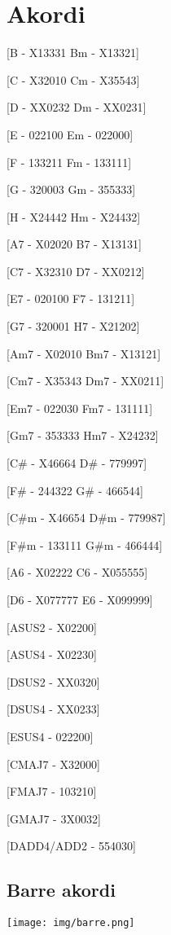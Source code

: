 \section{Akordi}
\begin{guitar}
[A - X02220  Am - X02210]

[B - X13331  Bm - X13321]

[C - X32010  Cm - X35543]  

[D - XX0232  Dm - XX0231] 

[E - 022100  Em - 022000] 

[F - 133211  Fm - 133111]

[G - 320003  Gm - 355333]

[H - X24442  Hm - X24432]


[A7 - X02020  B7 - X13131]

[C7 - X32310  D7 - XX0212]

[E7 - 020100  F7 - 131211]

[G7 - 320001  H7 - X21202]


[Am7 - X02010  Bm7 - X13121]

[Cm7 - X35343  Dm7 - XX0211]

[Em7 - 022030  Fm7 - 131111]

[Gm7 - 353333  Hm7 - X24232]


[C# - X46664  D# - 779997]

[F# - 244322  G# - 466544]


[C#m - X46654  D#m - 779987]

[F#m - 133111  G#m - 466444]


[A6 - X02222  C6 - X055555]

[D6 - X077777 E6 - X099999]


[ASUS2 - X02200]

[ASUS4 - X02230]

[DSUS2 - XX0320] 

[DSUS4 - XX0233]

[ESUS4 - 022200]

[CMAJ7 - X32000]

[FMAJ7 - 103210]

[GMAJ7 - 3X0032]

[DADD4/ADD2 - 554030]

\end{guitar}
\subsection*{Barre akordi}
\texttt{[image: img/barre.png]}
\clearpage
